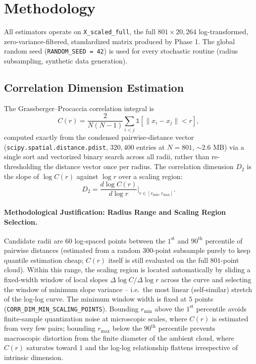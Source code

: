 \documentclass[11pt]{article}
\begin{document}
\section{Methodology}

All estimators operate on \texttt{X\_scaled\_full}, the full
$801 \times 20{,}264$ log-transformed, zero-variance-filtered,
standardized matrix produced by Phase 1. The global random seed
(\texttt{RANDOM\_SEED = 42}) is used for every stochastic routine (radius
subsampling, synthetic data generation).

\subsection{Correlation Dimension Estimation}

The Grassberger--Procaccia correlation integral is
\begin{equation}
C(r) = \frac{2}{N(N-1)} \sum_{i<j} \mathbb{1}\left[\lVert x_i - x_j \rVert < r\right],
\label{eq:corr-integral}
\end{equation}
computed exactly from the condensed pairwise-distance vector
(\texttt{scipy.spatial.distance.pdist}, $320{,}400$ entries at $N=801$,
$\sim 2.6$ MB) via a single sort and vectorized binary search across all
radii, rather than re-thresholding the distance vector once per radius.
The correlation dimension $D_2$ is the slope of $\log C(r)$ against
$\log r$ over a scaling region:
\begin{equation}
D_2 = \frac{d \log C(r)}{d \log r} \Bigg|_{r \in [r_{\min}, r_{\max}]}.
\label{eq:d2}
\end{equation}

\paragraph{Methodological Justification: Radius Range and Scaling Region Selection.}
Candidate radii are $60$ log-spaced points between the $1^{\text{st}}$ and
$90^{\text{th}}$ percentile of pairwise distances (estimated from a random
$300$-point subsample purely to keep quantile estimation cheap; $C(r)$
itself is still evaluated on the full $801$-point cloud). Within this
range, the scaling region is located automatically by sliding a
fixed-width window of local slopes
$\Delta \log C / \Delta \log r$ across the curve and selecting the window
of minimum slope variance -- i.e.\ the most linear (self-similar) stretch
of the log-log curve. The minimum window width is fixed at $5$ points
(\texttt{CORR\_DIM\_MIN\_SCALING\_POINTS}). Bounding $r_{\min}$ above the
$1^{\text{st}}$ percentile avoids finite-sample quantization noise at
microscopic scales, where $C(r)$ is estimated from very few pairs; bounding
$r_{\max}$ below the $90^{\text{th}}$ percentile prevents macroscopic
distortion from the finite diameter of the ambient cloud, where $C(r)$
saturates toward $1$ and the log-log relationship flattens irrespective of
intrinsic dimension.
\end{document}
